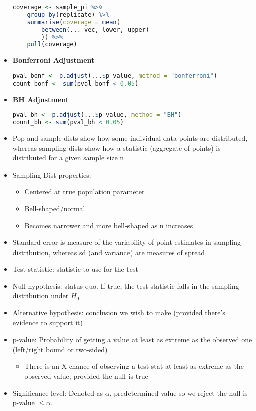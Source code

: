 \documentclass[8pt,landscape,a4paper, fleqn, dvipsnames]{extarticle}
\begin{document}
\begin{multicols*}{4}
\begin{itemize}
\begin{lstlisting}[language = R]
coverage <- sample_pi %>% 
    group_by(replicate) %>% 
    summarise(coverage = mean(
        between(..._vec, lower, upper)
        )) %>% 
    pull(coverage)
        \end{lstlisting}
        \item \textbf{Bonferroni Adjustment}
        \begin{lstlisting}[language = R]
pval_bonf <- p.adjust(...$p_value, method = "bonferroni")
count_bonf <- sum(pval_bonf < 0.05)
        \end{lstlisting}
        \item \textbf{BH Adjustment}
        \begin{lstlisting}[language = R]
pval_bh <- p.adjust(...$p_value, method = "BH")
count_bh <- sum(pval_bh < 0.05)
        \end{lstlisting}
    \item Pop and sample dists show how some individual data points are distributed, whereas sampling dists show how a statistic (aggregate of points) is distributed for a given sample size n
    \item Sampling Dist properties:
    \begin{itemize}
        \item Centered at true population parameter
        \item Bell-shaped/normal
        \item Becomes narrower and more bell-shaped as n increases
    \end{itemize}
    \item Standard error is measure of the variability of point estimates in sampling distribution, whereas sd (and variance) are measures of spread
    \item Test statistic: statistic to use for the test
    \item Null hypothesis: status quo. If true, the test statistic falls in the sampling distribution under $H_0$
    \item Alternative hypothesis: conclusion we wish to make (provided there's evidence to support it)
    \item p-value: Probability of getting a value at least as extreme as the observed one (left/right bound or two-sided)
    \begin{itemize}
        \item There is an X chance of observing a test stat at least as extreme as the observed value, provided the null is true
    \end{itemize}
    \item Significance level: Denoted as $\alpha$, predetermined value so we reject the null is p-value $\leq \alpha$.

\end{itemize}
\end{multicols*}
\end{document}
